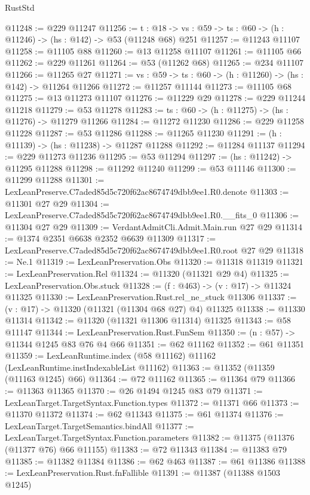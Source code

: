 \begin{lexlean}{RustStd}
\begin{coremodule}
@11248 := @229 @11247
@11256 := {t : @18} ->
  {vs : @59} -> {ts : @60} -> (h : @11246) -> (hs : @142) -> @53 (@11248 @68) @251
@11257 := @11243 @11107
@11258 := @11105 @88
@11260 := @13 @11258 @11107
@11261 := @11105 @66
@11262 := @229 @11261
@11264 := @53 (@11262 @68)
@11265 := @234 @11107
@11266 := @11265 @27
@11271 := {vs : @59} -> {ts : @60} -> (h : @11260) -> (hs : @142) -> @11264 @11266
@11272 := @11257 @11144
@11273 := @11105 @68
@11275 := @13 @11273 @11107
@11276 := @11229 @29
@11278 := @229 @11244 @11218
@11279 := @53 @11278
@11283 := {ts : @60} -> (h : @11275) -> (hs : @11276) -> @11279 @11266
@11284 := @11272 @11230
@11286 := @229 @11258 @11228
@11287 := @53 @11286
@11288 := @11265 @11230
@11291 := (h : @11139) -> (hs : @11238) -> @11287 @11288
@11292 := @11284 @11137
@11294 := @229 @11273 @11236
@11295 := @53 @11294
@11297 := (hs : @11242) -> @11295 @11288
@11298 := @11292 @11240
@11299 := @53 @11146
@11300 := @11299 @11288
@11301 := LexLeanPreserve.C7aded85d5c720f62ac8674749dbb9ee1.R0.denote
@11303 := @11301 @27 @29
@11304 := LexLeanPreserve.C7aded85d5c720f62ac8674749dbb9ee1.R0.__fits_0
@11306 := @11304 @27 @29
@11309 := VerdantAdmitCli.Admit.Main.run @27 @29
@11314 := @1374 @2351 @6638 @2352 @6639 @11309
@11317 := LexLeanPreserve.C7aded85d5c720f62ac8674749dbb9ee1.R0.root @27 @29
@11318 := Ne.{1}
@11319 := LexLeanPreservation.Obs
@11320 := @11318 @11319
@11321 := LexLeanPreservation.Rel
@11324 := @11320 (@11321 @29 @4)
@11325 := LexLeanPreservation.Obs.stuck
@11328 := (f : @463) -> (v : @17) -> @11324 @11325
@11330 := LexLeanPreservation.Rust.rel_ne_stuck @11306
@11337 := (v : @17) -> @11320 (@11321 (@11304 @68 @27) @4) @11325
@11338 := @11330 @11314
@11342 := @11320 (@11321 @11306 @11314) @11325
@11343 := @58 @11147
@11344 := LexLeanPreservation.Rust.FunSem
@11350 := (n : @57) -> @11344 @1245 @83 @76 @4 @66
@11351 := @62 @11162
@11352 := @61 @11351
@11359 := LexLeanRuntime.index (@58 @11162) @11162 (LexLeanRuntime.instIndexableList @11162)
@11363 := @11352 (@11359 (@11163 @1245) @66)
@11364 := @72 @11162
@11365 := @11364 @79
@11366 := @11363 @11365
@11370 := @26 @1494 @1245 @83 @79
@11371 := LexLeanTarget.TargetSyntax.Function.types
@11372 := @11371 @66
@11373 := @11370 @11372
@11374 := @62 @11343
@11375 := @61 @11374
@11376 := LexLeanTarget.TargetSemantics.bindAll
@11377 := LexLeanTarget.TargetSyntax.Function.parameters
@11382 := @11375 (@11376 (@11377 @76) @66 @11155)
@11383 := @72 @11343
@11384 := @11383 @79
@11385 := @11382 @11384
@11386 := @62 @463
@11387 := @61 @11386
@11388 := LexLeanPreservation.Rust.fnFallible
@11391 := @11387 (@11388 @1503 @1245)

\end{coremodule}
\end{lexlean}
